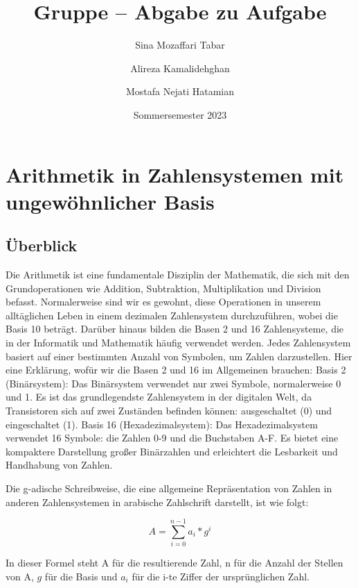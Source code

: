 \documentclass[course=erap]{aspdoc}
\author{Sina Mozaffari Tabar \and Alireza Kamalidehghan  \and Mostafa Nejati Hatamian}
\date{Sommersemester 2023} %
\title{Gruppe \theGroup{} -- Abgabe zu Aufgabe \theNumber}
\begin{document}
    \maketitle


    \section{Arithmetik in Zahlensystemen mit ungewöhnlicher Basis}

    \subsection{Überblick}
    Die Arithmetik ist eine fundamentale Disziplin der Mathematik, die sich mit den Grundoperationen wie Addition, Subtraktion, Multiplikation und Division befasst.
    Normalerweise sind wir es gewohnt, diese Operationen in unserem alltäglichen Leben in einem dezimalen Zahlensystem durchzuführen, wobei die Basis 10 beträgt.
    \newline
    Darüber hinaus bilden die Basen 2 und 16 Zahlensysteme, die in der Informatik und Mathematik häufig verwendet werden.
    Jedes Zahlensystem basiert auf einer bestimmten Anzahl von Symbolen, um Zahlen darzustellen.
    Hier eine Erklärung, wofür wir die Basen 2 und 16 im Allgemeinen brauchen:
    \newline
    \newline
    Basis 2 (Binärsystem):
    Das Binärsystem verwendet nur zwei Symbole, normalerweise 0 und 1.
    Es ist das grundlegendste Zahlensystem in der digitalen Welt, da Transistoren sich auf zwei Zuständen befinden können: ausgeschaltet (0) und eingeschaltet (1).
    \newline
    \newline
    Basis 16 (Hexadezimalsystem):
    Das Hexadezimalsystem verwendet 16 Symbole: die Zahlen 0-9 und die Buchstaben A-F. Es bietet eine kompaktere Darstellung großer Binärzahlen und erleichtert die Lesbarkeit und Handhabung von Zahlen.
    \newline
    \par
    Die g-adische Schreibweise, die eine allgemeine Repräsentation von Zahlen in anderen Zahlensystemen in arabische Zahlschrift darstellt, ist wie folgt:

    \begin{equation}
        \label{sumFormel}
        A = \sum_{i=0} ^{n-1} a_i * g^i
    \end{equation}


    In dieser Formel steht A für die resultierende Zahl, n für die Anzahl der Stellen von A, $g$ für die Basis und $a_i$ für die i-te Ziffer der ursprünglichen Zahl.
    \newline
\end{document}
